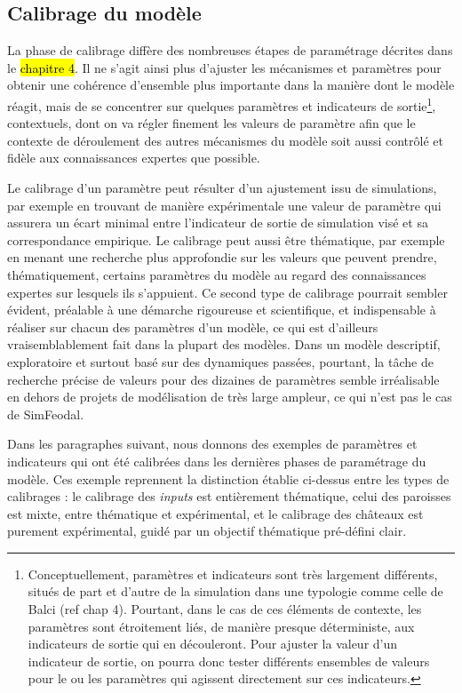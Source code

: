\subsection{Calibrage du modèle}

La phase de calibrage diffère des nombreuses étapes de paramétrage décrites dans le \hl{chapitre 4}.
Il  ne s'agit ainsi plus d'ajuster les mécanismes et paramètres pour obtenir une cohérence d'ensemble plus importante dans la manière dont le modèle réagit, mais de se concentrer sur quelques paramètres et indicateurs de sortie\footnote{
Conceptuellement, paramètres et indicateurs sont très largement différents, situés de part et d'autre de la simulation dans une typologie comme celle de Balci (ref chap 4).
Pourtant, dans le cas de ces éléments de contexte, les paramètres sont étroitement liés, de manière presque déterministe, aux indicateurs de sortie qui en découleront.
Pour \og ajuster\fg{} la valeur d'un indicateur de sortie, on pourra donc tester différents ensembles de valeurs pour le ou les paramètres qui agissent directement sur ces indicateurs.
}, contextuels, dont on va régler finement les valeurs de paramètre afin que le contexte de déroulement des autres mécanismes du modèle soit aussi contrôlé et fidèle aux connaissances expertes que possible.

Le calibrage d'un paramètre peut résulter d'un ajustement issu de simulations, par exemple en trouvant de manière expérimentale une valeur de paramètre qui assurera un écart minimal entre l'indicateur de sortie de simulation visé et sa correspondance empirique.
Le calibrage peut aussi être thématique, par exemple en menant une recherche plus approfondie sur les valeurs que peuvent prendre, thématiquement, certains paramètres du modèle au regard des connaissances expertes sur lesquels ils s'appuient.
Ce second type de calibrage pourrait sembler évident, préalable à une démarche rigoureuse et scientifique, et indispensable à réaliser sur chacun des paramètres d'un modèle, ce qui est d'ailleurs vraisemblablement fait dans la plupart des modèles.
Dans un modèle descriptif, exploratoire et surtout basé sur des dynamiques passées, pourtant, la tâche de recherche précise de valeurs pour des dizaines de paramètres semble irréalisable en dehors de projets de modélisation de très large ampleur, ce qui n'est pas le cas de SimFeodal.

Dans les paragraphes suivant, nous donnons des exemples de paramètres et indicateurs qui ont été calibrées dans les dernières phases de paramétrage du modèle.
Ces exemple reprennent la distinction établie ci-dessus entre les types de calibrages : le calibrage des \textit{inputs} est entièrement thématique, celui des paroisses est mixte, entre thématique et expérimental, et le calibrage des châteaux est purement expérimental, guidé par un objectif thématique pré-défini clair.


